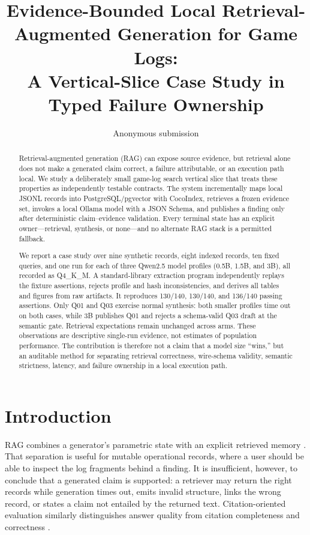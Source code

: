 \documentclass[10pt,twocolumn]{article}
\title{Evidence-Bounded Local Retrieval-Augmented Generation for Game Logs:\\
A Vertical-Slice Case Study in Typed Failure Ownership}
\author{Anonymous submission}
\date{}
\begin{document}
\maketitle

\begin{abstract}
Retrieval-augmented generation (RAG) can expose source evidence, but retrieval alone does not make a generated claim correct, a failure attributable, or an execution path local.  We study a deliberately small game-log search vertical slice that treats these properties as independently testable contracts.  The system incrementally maps local JSONL records into PostgreSQL/pgvector with CocoIndex, retrieves a frozen evidence set, invokes a local Ollama model with a JSON Schema, and publishes a finding only after deterministic claim--evidence validation.  Every terminal state has an explicit owner---retrieval, synthesis, or none---and no alternate RAG stack is a permitted fallback.

We report a case study over nine synthetic records, eight indexed records, ten fixed queries, and one run for each of three Qwen2.5 model profiles (0.5B, 1.5B, and 3B), all recorded as Q4\_K\_M.  A standard-library extraction program independently replays the fixture assertions, rejects profile and hash inconsistencies, and derives all tables and figures from raw artifacts.  It reproduces 130/140, 130/140, and 136/140 passing assertions.  Only Q01 and Q03 exercise normal synthesis: both smaller profiles time out on both cases, while 3B publishes Q01 and rejects a schema-valid Q03 draft at the semantic gate.  Retrieval expectations remain unchanged across arms.  These observations are descriptive single-run evidence, not estimates of population performance.  The contribution is therefore not a claim that a model size ``wins,'' but an auditable method for separating retrieval correctness, wire-schema validity, semantic strictness, latency, and failure ownership in a local execution path.
\end{abstract}

\section{Introduction}
RAG combines a generator's parametric state with an explicit retrieved memory \cite{lewis2020rag}.  That separation is useful for mutable operational records, where a user should be able to inspect the log fragments behind a finding.  It is insufficient, however, to conclude that a generated claim is supported: a retriever may return the right records while generation times out, emits invalid structure, links the wrong record, or states a claim not entailed by the returned text.  Citation-oriented evaluation similarly distinguishes answer quality from citation completeness and correctness \cite{gao2023alce}.
\end{document}
